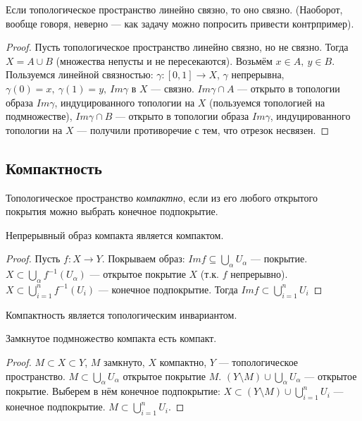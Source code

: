 \begin{statement}
    Если топологическое пространство линейно связно, то оно связно. (Наоборот, вообще говоря, неверно — как задачу можно попросить привести контрпример).
\end{statement}
\begin{proof}
    Пусть топологическое пространство линейно связно, но не связно. Тогда $X = A \cup B$ (множества непусты и не пересекаются). Возьмём $x \in A, \ y \in B$. Пользуемся линейной связностью: $\gamma: [0, 1] \to X$, $\gamma$ непрерывна, $\gamma(0) = x, \ \gamma(1) = y, \ Im \gamma$ в $X$ — связно.
    $Im \gamma \cap A$ — открыто в топологии образа $Im \gamma$, индуцированного топологии на $X$ (пользуемся топологией на подмножестве), $Im \gamma \cap B$ — открыто в топологии образа $Im \gamma$, индуцированного топологии на $X$ — получили противоречие с тем, что отрезок несвязен.
\end{proof}


\subsection{Компактность}
\begin{definition}
    Топологическое пространство \textit{компактно}, если из его любого открытого покрытия можно выбрать конечное подпокрытие.
\end{definition}

\begin{statement}
    Непрерывный образ компакта является компактом.
\end{statement}
\begin{proof}
    Пусть $f: X \to Y$. Покрываем образ: $Im f \subseteq \bigcup_{\alpha} U_{\alpha}$ — покрытие.
    $X \subset \bigcup_{\alpha} f^{-1}(U_{\alpha})$ — открытое покрытие $X$ (т.к. $f$ непрерывно).
    $X \subset \bigcup_{i = 1}^{n} f^{-1}(U_{i})$ — конечное подпокрытие.
    Тогда $Im f \subset \bigcup_{i = 1}^{n} U_{i}$
\end{proof}

\begin{remark}
    Компактность является топологическим инвариантом.
\end{remark}

\begin{statement}
    Замкнутое подмножество компакта есть компакт.
\end{statement}
\begin{proof}
    $M \subset X \subset Y$, $M$ замкнуто, $X$ компактно, $Y$ — топологическое пространство.
    $M \subset \bigcup_{\alpha} U_{\alpha}$ открытое покрытие $M$.
    $(Y \setminus M) \cup \bigcup_{\alpha} U_{\alpha}$ — открытое покрытие.
    Выберем в нём конечное подпокрытие:
    $X \subset (Y \setminus M) \cup \bigcup_{i = 1}^n U_i$ — конечное подпокрытие.
    $M \subset \bigcup_{i = 1}^n U_i$.
\end{proof}


